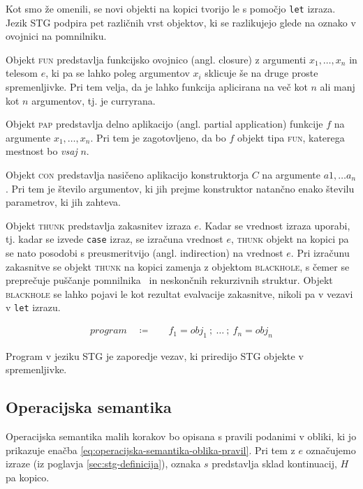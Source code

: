 Kot smo že omenili, se novi objekti na kopici tvorijo le s pomočjo \texttt{let} izraza. Jezik STG podpira pet različnih vrst objektov, ki se razlikujejo glede na oznako v ovojnici na pomnilniku.

Objekt \textsc{fun} predstavlja funkcijsko ovojnico (angl. closure) z argumenti $x_1, \dots, x_n$ in telesom $e$, ki pa se lahko poleg argumentov $x_i$ sklicuje še na druge proste spremenljivke. Pri tem velja, da je lahko funkcija aplicirana na več kot $n$ ali manj kot $n$ argumentov, tj. je curryrana.

Objekt \textsc{pap} predstavlja delno aplikacijo (angl. partial application) funkcije $f$ na argumente $x_1, \dots, x_n$. Pri tem je zagotovljeno, da bo $f$ objekt tipa \textsc{fun}, katerega mestnost bo \textit{vsaj} $n$.

Objekt \textsc{con} predstavlja nasičeno aplikacijo konstruktorja $C$ na argumente $a1, \dots a_n$. Pri tem je število argumentov, ki jih prejme konstruktor natančno enako številu parametrov, ki jih zahteva.

Objekt \textsc{thunk} predstavlja zakasnitev izraza $e$. Kadar se vrednost izraza uporabi, tj. kadar se izvede \texttt{case} izraz, se izračuna vrednost $e$, \textsc{thunk} objekt na kopici pa se nato posodobi s preusmeritvijo (angl. indirection) na vrednost $e$. Pri izračunu zakasnitve se objekt \textsc{thunk} na kopici zamenja z objektom \textsc{blackhole}, s čemer se preprečuje puščanje pomnilnika~\cite{jones1992tail} in neskončnih rekurzivnih struktur. Objekt \textsc{blackhole} se lahko pojavi le kot rezultat evalvacije zakasnitve, nikoli pa v vezavi v \texttt{let} izrazu.

\begin{align*}
	program \quad \coloneq& \quad f_1 = obj_1 \: ; \: \dots \: ; \: f_n = obj_n
\end{align*}

Program v jeziku STG je zaporedje vezav, ki priredijo STG objekte v spremenljivke.

\subsection{Operacijska semantika}
\label{sec:operacijska-semantika}

Operacijska semantika malih korakov bo opisana s pravili podanimi v obliki, ki jo prikazuje enačba \ref{eq:operacijska-semantika-oblika-pravil}. Pri tem z $e$ označujemo izraze (iz poglavja \ref{sec:stg-definicija}), oznaka $s$ predstavlja sklad kontinuacij, $H$ pa kopico.

